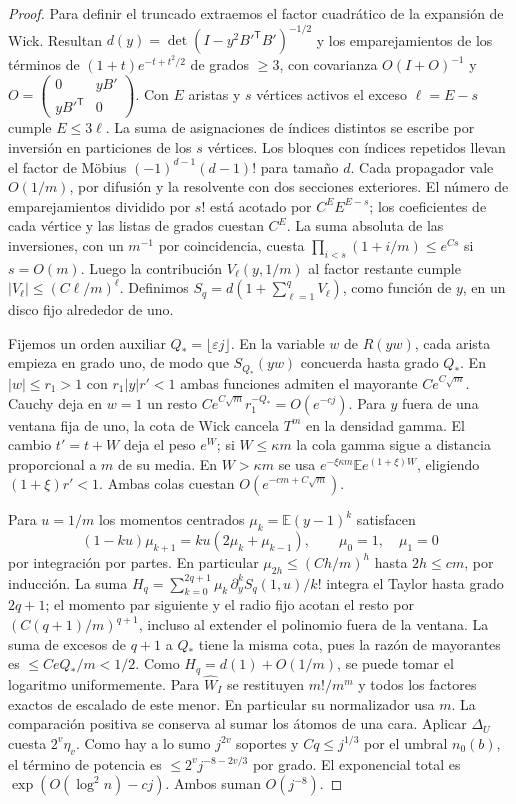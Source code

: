\begin{proof}
Para definir el truncado extraemos el factor cuadrático de la expansión de Wick.
Resultan \(d(y)=\det(I-y^2 B'^{\mathsf T}B')^{-1/2}\) y los emparejamientos de
los términos de \((1+t)e^{-t+t^2/2}\) de grados \(\ge3\), con covarianza
\(O(I+O)^{-1}\) y \(O=\left(\begin{smallmatrix}0&yB'\\yB'^{\mathsf T}&0\end{smallmatrix}\right)\).
Con \(E\) aristas y \(s\) vértices activos el exceso \(\ell=E-s\) cumple \(E\le3\ell\).
La suma de asignaciones de índices distintos se escribe por inversión en particiones de
los \(s\) vértices. Los bloques con índices repetidos llevan el factor de Möbius
\((-1)^{d-1}(d-1)!\) para tamaño \(d\). Cada propagador vale \(O(1/m)\), por difusión
y la resolvente con dos secciones exteriores. El número de emparejamientos dividido por
\(s!\) está acotado por \(C^E E^{E-s}\); los coeficientes de cada vértice y las listas
de grados cuestan \(C^E\). La suma absoluta de las inversiones, con un \(m^{-1}\) por
coincidencia, cuesta \(\prod_{i<s}(1+i/m)\le e^{Cs}\) si \(s=O(m)\).
Luego la contribución \(V_\ell(y,1/m)\) al factor restante cumple
\(|V_\ell|\le(C\ell/m)^\ell\). Definimos \(S_q=d(1+\sum_{\ell=1}^q V_\ell)\),
como función de \(y\), en un disco fijo alrededor de uno.

Fijemos un orden auxiliar \(Q_*=\lfloor\varepsilon j\rfloor\). En la variable \(w\)
de \(R(yw)\), cada arista empieza en grado uno, de modo que \(S_{Q_*}(yw)\) concuerda
hasta grado \(Q_*\). En \(|w|\le r_1>1\) con \(r_1|y|r'<1\) ambas funciones admiten
el mayorante \(Ce^{C\sqrt m}\). Cauchy deja en \(w=1\) un resto
\(Ce^{C\sqrt m}r_1^{-Q_*}=O(e^{-cj})\). Para \(y\) fuera de una ventana fija de uno,
la cota de Wick cancela \(T^m\) en la densidad gamma. El cambio \(t'=t+W\) deja el peso
\(e^W\); si \(W\le\kappa m\) la cola gamma sigue a distancia proporcional a \(m\) de su
media. En \(W>\kappa m\) se usa \(e^{-\xi\kappa m}\mathbb E e^{(1+\xi)W}\), eligiendo
\((1+\xi)r'<1\). Ambas colas cuestan \(O(e^{-cm+C\sqrt m})\).

Para \(u=1/m\) los momentos centrados \(\mu_k=\mathbb E(y-1)^k\) satisfacen
\[
 (1-ku)\mu_{k+1}=ku(2\mu_k+\mu_{k-1}),\qquad \mu_0=1,\quad\mu_1=0
\]
por integración por partes. En particular \(\mu_{2h}\le(Ch/m)^h\) hasta \(2h\le c m\),
por inducción. La suma
\(H_q=\sum_{k=0}^{2q+1}\mu_k\,\partial_y^k S_q(1,u)/k!\)
integra el Taylor hasta grado \(2q+1\); el momento par siguiente y el radio fijo
acotan el resto por \((C(q+1)/m)^{q+1}\), incluso al extender el polinomio fuera de la
ventana. La suma de excesos de \(q+1\) a \(Q_*\) tiene la misma cota, pues la razón
de mayorantes es \(\le Ce Q_*/m<1/2\). Como \(H_q=d(1)+O(1/m)\), se puede tomar el
logaritmo uniformemente. Para \(\widehat W_I\) se restituyen \(m!/m^m\) y todos los
factores exactos de escalado de este menor. En particular su normalizador usa \(m\).
La comparación positiva se conserva al sumar los átomos de una cara. Aplicar
\(\Delta_U\) cuesta \(2^v\eta_v\). Como hay a lo sumo \(j^{2v}\) soportes y
\(Cq\le j^{1/3}\) por el umbral \(n_0(b)\), el término de potencia es
\(\le2^v j^{-8-2v/3}\) por grado. El exponencial total es
\(\exp(O(\log^2 n)-cj)\). Ambos suman \(O(j^{-8})\).
\end{proof}

